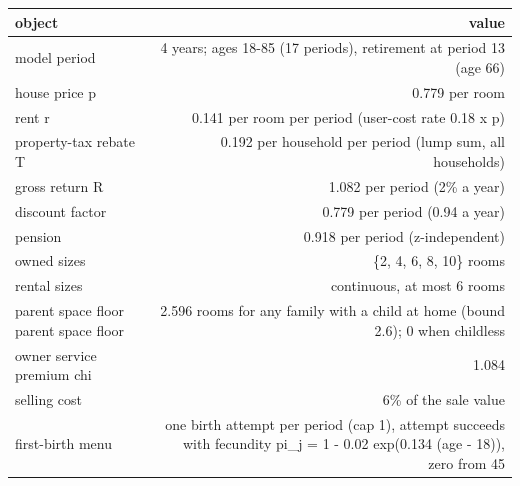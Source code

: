 \begin{tabular}{lr}
\toprule
object & value \\
\midrule
model period & 4 years; ages 18-85 (17 periods), retirement at period 13 (age 66) \\
house price p & 0.779 per room \\
rent r & 0.141 per room per period (user-cost rate 0.18 x p) \\
property-tax rebate T & 0.192 per household per period (lump sum, all households) \\
gross return R & 1.082 per period (2\% a year) \\
discount factor & 0.779 per period (0.94 a year) \\
pension & 0.918 per period (z-independent) \\
owned sizes & \{2, 4, 6, 8, 10\} rooms \\
rental sizes & continuous, at most 6 rooms \\
parent space floor parent space floor & 2.596 rooms for any family with a child at home (bound 2.6); 0 when childless \\
owner service premium chi & 1.084 \\
selling cost & 6\% of the sale value \\
first-birth menu & one birth attempt per period (cap 1), attempt succeeds with fecundity pi\_j = 1 - 0.02 exp(0.134 (age - 18)), zero from 45 \\
\bottomrule
\end{tabular}
